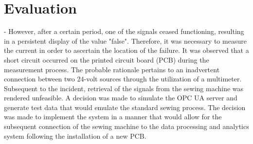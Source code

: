 \chapter{Evaluation}
 -	However, after a certain period, one of the signals ceased functioning, resulting in a persistent display of the value "false". Therefore, it was necessary to measure the current in order to ascertain the location of the failure. It was observed that a short circuit occurred on the printed circuit board (PCB) during the measurement process. The probable rationale pertains to an inadvertent connection between two 24-volt sources through the utilization of a multimeter.  Subsequent to the incident, retrieval of the signals from the sewing machine was rendered unfeasible. A decision was made to simulate the OPC UA server and generate test data that would emulate the standard sewing process. The decision was made to implement the system in a manner that would allow for the subsequent connection of the sewing machine to the data processing and analytics system following the installation of a new PCB.